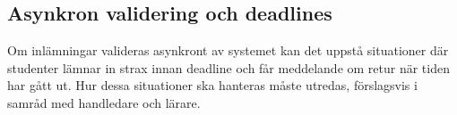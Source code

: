 \subsection{Asynkron validering och deadlines}

Om inlämningar valideras asynkront av systemet kan det uppstå situationer där studenter lämnar in strax innan deadline och får meddelande om retur när tiden har gått ut. Hur dessa situationer ska hanteras måste utredas, förslagsvis i samråd med handledare och lärare.
